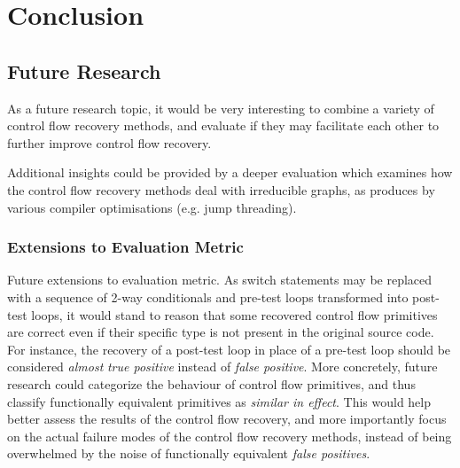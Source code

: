 
\section{Conclusion}


\subsection{Future Research}

As a future research topic, it would be very interesting to combine a variety of control flow recovery methods, and evaluate if they may facilitate each other to further improve control flow recovery.

Additional insights could be provided by a deeper evaluation which examines how the control flow recovery methods deal with irreducible graphs, as produces by various compiler optimisations (e.g. jump threading).

\subsubsection{Extensions to Evaluation Metric}
\label{sec:extensions_to_evaluation_metric}


Future extensions to evaluation metric. As switch statements may be replaced with a sequence of 2-way conditionals and pre-test loops transformed into post-test loops, it would stand to reason that some recovered control flow primitives are correct even if their specific type is not present in the original source code. For instance, the recovery of a post-test loop in place of a pre-test loop should be considered \textit{almost} \textit{true positive} instead of \textit{false positive}. More concretely, future research could categorize the behaviour of control flow primitives, and thus classify functionally equivalent primitives as \textit{similar in effect}. This would help better assess the results of the control flow recovery, and more importantly focus on the actual failure modes of the control flow recovery methods, instead of being overwhelmed by the noise of functionally equivalent \textit{false positives}.
